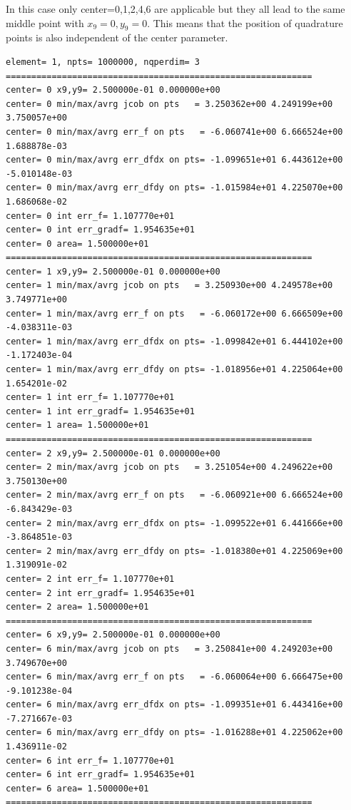 In this case only {\python center=0,1,2,4,6} are applicable but they all 
lead to the same middle point with $x_9=0,y_9=0$. This means that the position of 
quadrature points is also independent of the {\python center} parameter.

\begin{tiny}
\begin{verbatim}
element= 1, npts= 1000000, nqperdim= 3
============================================================
center= 0 x9,y9= 2.500000e-01 0.000000e+00 
center= 0 min/max/avrg jcob on pts   = 3.250362e+00 4.249199e+00 3.750057e+00
center= 0 min/max/avrg err_f on pts   = -6.060741e+00 6.666524e+00 1.688878e-03
center= 0 min/max/avrg err_dfdx on pts= -1.099651e+01 6.443612e+00 -5.010148e-03
center= 0 min/max/avrg err_dfdy on pts= -1.015984e+01 4.225070e+00 1.686068e-02
center= 0 int err_f= 1.107770e+01
center= 0 int err_gradf= 1.954635e+01
center= 0 area= 1.500000e+01
============================================================
center= 1 x9,y9= 2.500000e-01 0.000000e+00 
center= 1 min/max/avrg jcob on pts   = 3.250930e+00 4.249578e+00 3.749771e+00
center= 1 min/max/avrg err_f on pts   = -6.060172e+00 6.666509e+00 -4.038311e-03
center= 1 min/max/avrg err_dfdx on pts= -1.099842e+01 6.444102e+00 -1.172403e-04
center= 1 min/max/avrg err_dfdy on pts= -1.018956e+01 4.225064e+00 1.654201e-02
center= 1 int err_f= 1.107770e+01
center= 1 int err_gradf= 1.954635e+01
center= 1 area= 1.500000e+01
============================================================
center= 2 x9,y9= 2.500000e-01 0.000000e+00 
center= 2 min/max/avrg jcob on pts   = 3.251054e+00 4.249622e+00 3.750130e+00
center= 2 min/max/avrg err_f on pts   = -6.060921e+00 6.666524e+00 -6.843429e-03
center= 2 min/max/avrg err_dfdx on pts= -1.099522e+01 6.441666e+00 -3.864851e-03
center= 2 min/max/avrg err_dfdy on pts= -1.018380e+01 4.225069e+00 1.319091e-02
center= 2 int err_f= 1.107770e+01
center= 2 int err_gradf= 1.954635e+01
center= 2 area= 1.500000e+01
============================================================
center= 6 x9,y9= 2.500000e-01 0.000000e+00 
center= 6 min/max/avrg jcob on pts   = 3.250841e+00 4.249203e+00 3.749670e+00
center= 6 min/max/avrg err_f on pts   = -6.060064e+00 6.666475e+00 -9.101238e-04
center= 6 min/max/avrg err_dfdx on pts= -1.099351e+01 6.443416e+00 -7.271667e-03
center= 6 min/max/avrg err_dfdy on pts= -1.016288e+01 4.225062e+00 1.436911e-02
center= 6 int err_f= 1.107770e+01
center= 6 int err_gradf= 1.954635e+01
center= 6 area= 1.500000e+01
============================================================
\end{verbatim}
\end{tiny}
 
